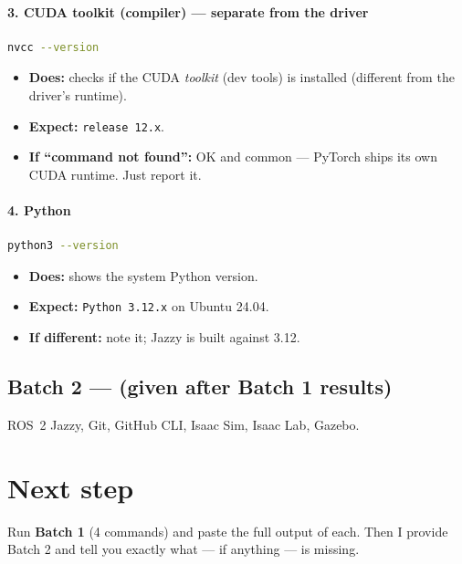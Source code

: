 \documentclass[11pt]{article}
\begin{document}
\paragraph{3. CUDA toolkit (compiler) --- separate from the driver}
\begin{lstlisting}[language=bash]
nvcc --version
\end{lstlisting}
\begin{itemize}[leftmargin=*]
  \item \textbf{Does:} checks if the CUDA \emph{toolkit} (dev tools) is installed
  (different from the driver's runtime).
  \item \textbf{Expect:} \texttt{release 12.x}.
  \item \textbf{If ``command not found'':} OK and common --- PyTorch ships its own
  CUDA runtime. Just report it.
\end{itemize}

\paragraph{4. Python}
\begin{lstlisting}[language=bash]
python3 --version
\end{lstlisting}
\begin{itemize}[leftmargin=*]
  \item \textbf{Does:} shows the system Python version.
  \item \textbf{Expect:} \texttt{Python 3.12.x} on Ubuntu 24.04.
  \item \textbf{If different:} note it; Jazzy is built against 3.12.
\end{itemize}

\subsection{Batch 2 --- (given after Batch 1 results)}
ROS~2 Jazzy, Git, GitHub CLI, Isaac Sim, Isaac Lab, Gazebo.

\section*{Next step}
Run \textbf{Batch 1} (4 commands) and paste the full output of each. Then I provide
Batch 2 and tell you exactly what --- if anything --- is missing.
\end{document}
